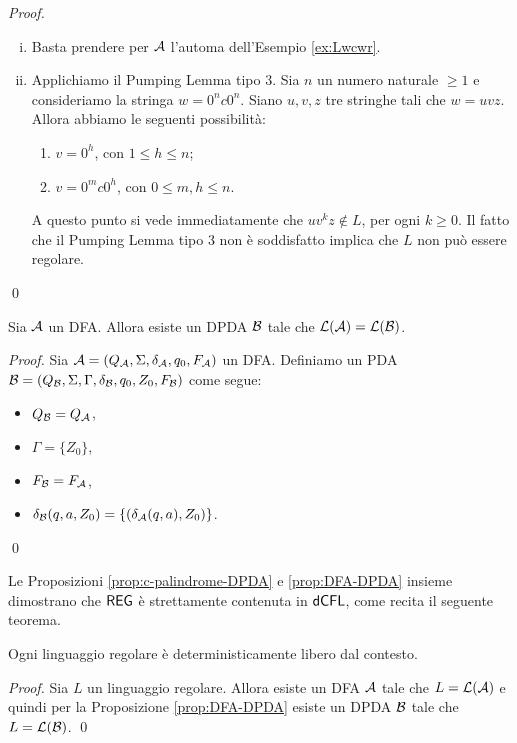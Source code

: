 \documentclass[runningheads,a4paper]{llncs}
\begin{document}
\begin{proof}
\begin{enumerate}[(i)]
\item Basta prendere per $\mathcal{A}$ l'automa dell'Esempio \ref{ex:Lwcwr}.
\item Applichiamo il Pumping Lemma tipo 3. Sia $n$ un numero naturale $\geq 1$ e consideriamo la stringa $w=0^nc0^n$. Siano $u,v,z$ tre stringhe tali che $w = uvz$. Allora abbiamo le seguenti possibilit\`{a}:
\begin{enumerate}[(1)]
  \item $v=0^h$, con $1\leq h \leq n$;
  \item $v=0^mc0^h$, con $0\leq m,h \leq n$.
\end{enumerate}
A questo punto si vede immediatamente che $uv^kz \not\in L$, per ogni $k \geq 0$. Il fatto che il Pumping Lemma tipo 3 non \`{e} soddisfatto implica che $L$ non pu\`{o} essere regolare.
\end{enumerate}
\qed\end{proof}

\begin{proposition}\label{prop:DFA-DPDA}
Sia $\mathcal{A}$ un DFA. Allora esiste un DPDA $\mathcal{B}$ tale che $\mathcal{L}(\mathcal{A}) = \mathcal{L}(\mathcal{B})$.
\end{proposition}

\begin{proof}
Sia $\mathcal{A} = (Q_{\mathcal{A}},\Sigma,\delta_{\mathcal{A}},q_0,F_{\mathcal{A}})$ un DFA. Definiamo un PDA $\mathcal{B} = (Q_{\mathcal{B}},\Sigma,\Gamma,\delta_{\mathcal{B}},q_0,Z_0,F_{\mathcal{B}})$ come segue:
\begin{itemize}
\item $Q_{\mathcal{B}} = Q_{\mathcal{A}}$,
\item $\Gamma = \{Z_0\}$,
\item $F_{\mathcal{B}} = F_{\mathcal{A}}$,
\item $\delta_{\mathcal{B}}(q,a,Z_0) = \{(\delta_{\mathcal{A}}(q,a),Z_0)\}$.
\end{itemize}
\qed\end{proof}

Le Proposizioni \ref{prop:c-palindrome-DPDA} e \ref{prop:DFA-DPDA} insieme dimostrano che $\mathsf{REG}$ \`{e} strettamente contenuta in $\mathsf{dCFL}$, come recita il seguente teorema.

\begin{theorem}\label{thm:reg-cfl}
Ogni linguaggio regolare \`{e} deterministicamente libero dal contesto.
\end{theorem}

\begin{proof}
Sia $L$ un linguaggio regolare. Allora esiste un DFA $\mathcal{A}$ tale che $L = \mathcal{L}(\mathcal{A})$ e quindi per la Proposizione \ref{prop:DFA-DPDA} esiste un DPDA $\mathcal{B}$ tale che $L = \mathcal{L}(\mathcal{B})$.
\qed\end{proof}

%
\end{document}
